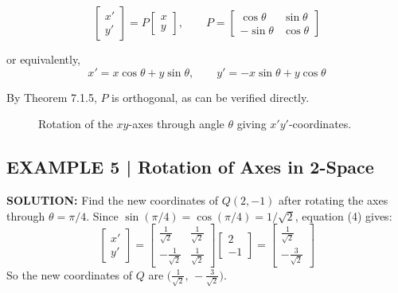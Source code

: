 \documentclass{article}
\theoremstyle{mystyle}
\begin{document}
\begin{equation}
  \begin{bmatrix}x'\\y'\end{bmatrix}
  = P\begin{bmatrix}x\\y\end{bmatrix}, \qquad
  P = \begin{bmatrix}\cos\theta & \sin\theta\\-\sin\theta & \cos\theta\end{bmatrix}
  \tag{4}
\end{equation}

\noindent or equivalently,
\[
  \boxed{x' = x\cos\theta + y\sin\theta, \qquad y' = -x\sin\theta + y\cos\theta}
  \tag{5}
\]

By Theorem 7.1.5, $P$ is orthogonal, as can be verified directly.

\begin{figure}[h]
\centering
{}
\caption{Rotation of the $xy$-axes through angle $\theta$ giving $x'y'$-coordinates.}
\end{figure}

\subsection*{EXAMPLE 5 | Rotation of Axes in 2-Space}

\textbf{SOLUTION:} Find the new coordinates of $Q(2,-1)$ after rotating the axes through
$\theta=\pi/4$. Since $\sin(\pi/4)=\cos(\pi/4)=1/\sqrt{2}$, equation (4) gives:
\[
  \begin{bmatrix}x'\\y'\end{bmatrix}
  = \begin{bmatrix}\tfrac{1}{\sqrt{2}} & \tfrac{1}{\sqrt{2}}\\[4pt]
                   -\tfrac{1}{\sqrt{2}} & \tfrac{1}{\sqrt{2}}\end{bmatrix}
    \begin{bmatrix}2\\-1\end{bmatrix}
  = \begin{bmatrix}\tfrac{1}{\sqrt{2}}\\[4pt]-\tfrac{3}{\sqrt{2}}\end{bmatrix}
\]
So the new coordinates of $Q$ are $\bigl(\tfrac{1}{\sqrt{2}},\,-\tfrac{3}{\sqrt{2}}\bigr)$.
\end{document}
